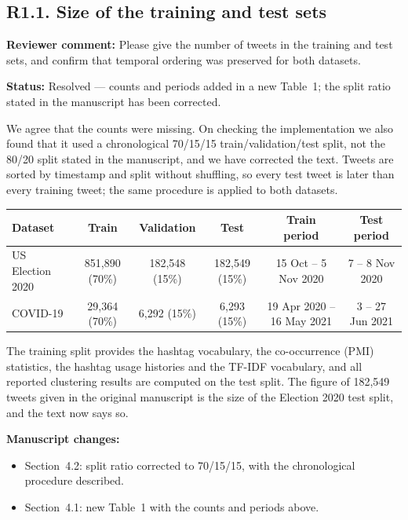 \documentclass[11pt,a4paper]{article}
\newcommand{\status}[1]{\textbf{\color{statusgreen}Status:} #1}
\newcommand{\parthead}[1]{\par\medskip\textbf{#1}\par}
\begin{document}
\subsection{R1.1. Size of the training and test sets}

\begin{revcomment}
\textbf{Reviewer comment:} Please give the number of tweets in the training and test sets, and confirm that temporal ordering was preserved for both datasets.
\end{revcomment}

\status{Resolved --- counts and periods added in a new Table~1; the split ratio stated in the manuscript has been corrected.}

We agree that the counts were missing. On checking the implementation we also found that it used a chronological 70/15/15 train/validation/test split, not the 80/20 split stated in the manuscript, and we have corrected the text. Tweets are sorted by timestamp and split without shuffling, so every test tweet is later than every training tweet; the same procedure is applied to both datasets.

\begin{center}
\footnotesize
\setlength{\tabcolsep}{4pt}
\begin{tabular}{lccccc}
\toprule
Dataset & Train & Validation & Test & Train period & Test period \\
\midrule
US Election 2020 & 851,890 (70\%) & 182,548 (15\%) & 182,549 (15\%) & 15 Oct -- 5 Nov 2020 & 7 -- 8 Nov 2020 \\
COVID-19 & 29,364 (70\%) & 6,292 (15\%) & 6,293 (15\%) & 19 Apr 2020 -- 16 May 2021 & 3 -- 27 Jun 2021 \\
\bottomrule
\end{tabular}
\end{center}

The training split provides the hashtag vocabulary, the co-occurrence (PMI) statistics, the hashtag usage histories and the TF-IDF vocabulary, and all reported clustering results are computed on the test split. The figure of 182,549 tweets given in the original manuscript is the size of the Election 2020 test split, and the text now says so.

\parthead{Manuscript changes:}
\begin{itemize}
\item Section~4.2: split ratio corrected to 70/15/15, with the chronological procedure described.
\item Section~4.1: new Table~1 with the counts and periods above.
\end{itemize}
\end{document}
